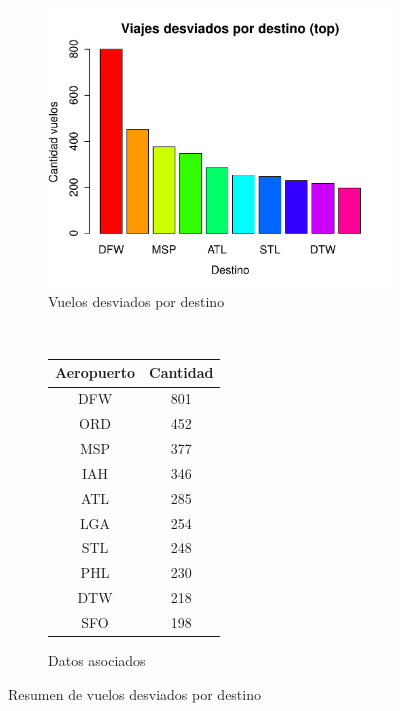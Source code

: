 \documentclass[12pt]{article}
\numberwithin{equation}{section}
\numberwithin{table}{section}
\numberwithin{figure}{section}
\begin{document}
\begin{figure}
        \centering
        ~
        \begin{subfigure}[b]{0.6\textwidth}
                \includegraphics[width=1\columnwidth]{imagenes/desviados/viajes-desviados-por-destino-top}
                \caption{Vuelos desviados por destino}
        \end{subfigure}
        ~
        \begin{subfigure}[b]{0.3\textwidth}
\begin{tabular}{@{}cc@{}}
\toprule
\textbf{Aeropuerto} & \textbf{Cantidad} \\ \midrule
DFW                 & 801               \\
ORD                 & 452               \\
MSP                 & 377               \\
IAH                 & 346               \\
ATL                 & 285               \\
LGA                 & 254               \\
STL                 & 248               \\
PHL                 & 230               \\
DTW                 & 218               \\
SFO                 & 198               \\ \bottomrule
\end{tabular}
                \caption{Datos asociados}
        \end{subfigure}
        \caption{Resumen de vuelos desviados por destino}
        \label{fig:desviados-por-destino}
\end{figure}
\end{document}

